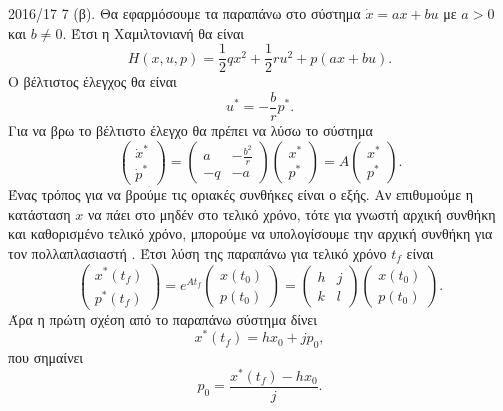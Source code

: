 \begin{solution}{2016/17 7}
    (β). Θα εφαρμόσουμε τα παραπάνω στο σύστημα \( \dot{x} = ax + bu \) με \( a >
    0 \) και \( b \neq 0 \). Έτσι η Χαμιλτονιανή θα είναι
    \[
        H(x, u, p) = \frac{1}{2}qx^2 + \frac{1}{2}ru^2 + p(ax + bu).
    \]
    Ο βέλτιστος έλεγχος θα είναι
    \[
        u^* = -\frac{b}{r}p^*.
    \]
    Για να βρω το βέλτιστο έλεγχο θα πρέπει να λύσω το σύστημα
    \begin{equation*}
        \begin{pmatrix}
            \dot{x}^* \\
            \dot{p}^*
        \end{pmatrix} =
        \begin{pmatrix}
            a & -\frac{b^2}{r} \\
            -q & -a
        \end{pmatrix}
        \begin{pmatrix}
            x^* \\
            p^*
        \end{pmatrix} = A
        \begin{pmatrix}
            x^* \\
            p^*
        \end{pmatrix}.
    \end{equation*}
    Ένας τρόπος για να βρούμε τις οριακές συνθήκες είναι ο εξής. Αν επιθυμούμε
    η κατάσταση \( x \) να πάει στο μηδέν στο τελικό χρόνο, τότε
    για γνωστή αρχική συνθήκη και καθορισμένο τελικό χρόνο, μπορούμε να
    υπολογίσουμε την αρχική συνθήκη για τον πολλαπλασιαστή . Έτσι
    λύση της παραπάνω για τελικό χρόνο \( t_f \) είναι
    \begin{equation*}
        \begin{pmatrix}
            x^*(t_f) \\
            p^*(t_f)
        \end{pmatrix} =
        e^{At_f}
        \begin{pmatrix}
            x(t_0) \\
            p(t_0)
        \end{pmatrix} =
        \begin{pmatrix}
            h & j \\
            k & l
        \end{pmatrix}
        \begin{pmatrix}
            x(t_0) \\
            p(t_0)
        \end{pmatrix}.
    \end{equation*}
    Άρα η πρώτη σχέση από το παραπάνω σύστημα δίνει
    \[
        x^*(t_f) = hx_0 + j p_0,
    \]
    που σημαίνει
    \[
        p_0 = \frac{x^*(t_f) - hx_0}{j}.
    \]


\end{solution}
